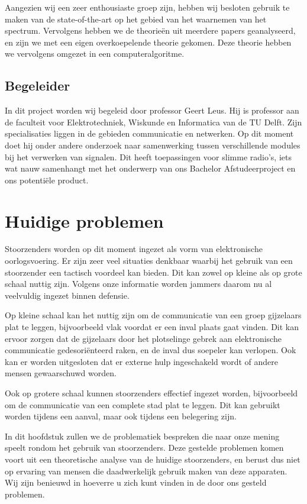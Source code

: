 \documentclass[oneside, a4paper, openany]{memoir}
\begin{document}
Aangezien wij een zeer enthousiaste groep zijn, hebben wij besloten gebruik te maken van de state-of-the-art op het gebied van het waarnemen van het spectrum. Vervolgens hebben we de theorieën uit meerdere papers geanalyseerd, en zijn we met een eigen overkoepelende theorie gekomen. Deze theorie hebben we vervolgens omgezet in een computeralgoritme.

\section{Begeleider}
In dit project worden wij begeleid door professor Geert Leus. Hij is professor aan de faculteit voor Elektrotechniek, Wiskunde en Informatica van de TU Delft. Zijn specialisaties liggen in de gebieden communicatie en netwerken. Op dit moment doet hij onder andere onderzoek naar samenwerking tussen verschillende modules bij het verwerken van signalen. Dit heeft toepassingen voor slimme radio's, iets wat nauw samenhangt met het onderwerp van ons Bachelor Afstudeerproject en ons potentiële product.

\chapter{Huidige problemen}
Stoorzenders worden op dit moment ingezet als vorm van elektronische oorlogsvoering. Er zijn zeer veel situaties denkbaar waarbij het gebruik van een stoorzender een tactisch voordeel kan bieden. Dit kan zowel op kleine als op grote schaal nuttig zijn. Volgens onze informatie worden jammers daarom nu al veelvuldig ingezet binnen defensie.

Op kleine schaal kan het nuttig zijn om de communicatie van een groep gijzelaars plat te leggen, bijvoorbeeld vlak voordat er een inval plaats gaat vinden. Dit kan ervoor zorgen dat de gijzelaars door het plotselinge gebrek aan elektronische communicatie gedesoriënteerd raken, en de inval dus soepeler kan verlopen. Ook kan er worden uitgesloten dat er externe hulp ingeschakeld wordt of andere mensen gewaarschuwd worden.

Ook op grotere schaal kunnen stoorzenders effectief ingezet worden, bijvoorbeeld om de communicatie van een complete stad plat te leggen. Dit kan gebruikt worden tijdens een aanval, maar ook tijdens een belegering zijn.

In dit hoofdstuk zullen we de problematiek bespreken die naar onze mening speelt rondom het gebruik van stoorzenders. Deze gestelde problemen komen voort uit een theoretische analyse van de huidige stoorzenders, en berust dus niet op ervaring van mensen die daadwerkelijk gebruik maken van deze apparaten. Wij zijn benieuwd in hoeverre u zich kunt vinden in de door ons gesteld problemen.
\end{document}
